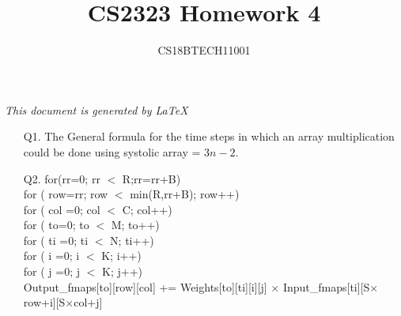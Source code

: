 \documentclass[letterpaper]{article}
\title{CS2323 Homework 4}
\author{CS18BTECH11001}
\begin{document}
\begin{large}
\maketitle
\begin{center}
\textit{This document is generated by \LaTeX}
\end{center}
\begin{flushleft}
\begin{enumerate}
\item[Q1. ]
The General formula for the time steps in which an array multiplication could be done using systolic array = $3n -2$.\\[0.1in]
\item[Q2. ]
for(rr=0; rr $<$ R;rr=rr+B)\\[0.1in]
for ( row=rr; row $<$ min(R,rr+B); row++)\\[0.1in]
for ( col =0; col $<$ C; col++)\\[0.1in]
for ( to=0; to $<$ M; to++)\\[0.1in]
for ( ti =0; ti $<$ N; ti++)\\[0.1in]
for ( i =0; i $<$ K; i++)\\[0.1in]
for ( j =0; j $<$ K; j++)\\[0.1in]
Output\_fmaps[to][row][col] += Weights[to][ti][i][j] $\times$ Input\_fmaps[ti][S$\times$row+i][S$\times$col+j]\\[0.1in]


\end{enumerate}
\end{flushleft}
\end{large}
\end{document}
